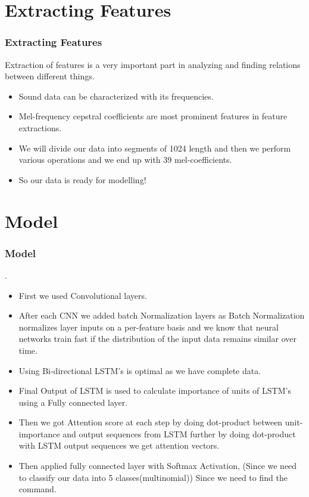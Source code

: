 \documentclass{beamer}
\begin{document}
\section{Extracting Features}
\begin{frame}
\frametitle{Extracting Features}

Extraction of features is a very important part in analyzing and finding relations between different things.\\

\begin{itemize}
    \item<1-> Sound data can be characterized with its frequencies.
    \item<2-> Mel-frequency cepstral coefficients are most prominent features in feature extractions. 
    \item<3-> We will divide our data into segments of 1024 length and then we perform various operations and we end up with 39 mel-coefficients.
    \item<4-> So our data is ready for modelling!
\end{itemize}
\end{frame}


\section{Model}
\begin{frame}
\frametitle{Model}

.

\begin{itemize}
    \item<1-> First we used Convolutional layers.
    \item<2-> After each CNN we added batch Normalization layers as Batch Normalization normalizes layer inputs on a per-feature basis and we know that neural networks train fast if the distribution of the input data remains similar over time.
    \item<3-> Using Bi-directional LSTM's is optimal as we have complete data.
    \item<4-> Final Output of LSTM is used to calculate importance of units of LSTM's using a Fully connected layer.
    \item<5-> Then we got Attention score at each step by doing dot-product between unit-importance and output sequences from LSTM further by doing dot-product with LSTM output sequences we get attention vectors.
    \item<6-> Then applied fully connected layer with Softmax Activation, (Since we need to classify our data into 5 classes(multinomial)) Since we need to find the command.
\end{itemize}
\end{frame}
\end{document}
